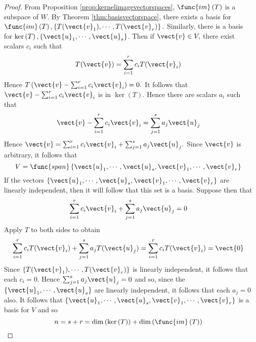 \begin{proof}
From Proposition \ref{prop:kernelimagevectorspaces}, $\func{im}\left( T\right) $
is a subspace of $W.$ By Theorem \ref{thm:basisvectorspace}, there exists a basis for $
\func{im}\left( T\right) ,\left\{ T(\vect{v}_{1}),\cdots ,T(\vect{v}_{r})\right\}
. $ Similarly, there is a basis for $\ker \left( T\right) ,\left\{ \vect{u}
_{1},\cdots ,\vect{u}_{s}\right\} $. Then if $\vect{v}\in V,$ there exist
scalars $c_{i}$ such that 
\begin{equation*}
T(\vect{v})=\sum_{i=1}^{r}c_{i}T(\vect{v}_{i})
\end{equation*}
Hence $T\left( \vect{v}-\sum_{i=1}^{r}c_{i}\vect{v}_{i}\right) =0.$ It follows
that $\vect{v}-\sum_{i=1}^{r}c_{i}\vect{v}_{i}$ is in $\ker \left( T\right) $.
Hence there are scalars $a_{i}$ such that 
\begin{equation*}
\vect{v}-\sum_{i=1}^{r}c_{i}\vect{v}_{i}=\sum_{j=1}^{s}a_{j}\vect{u}_{j}
\end{equation*}
Hence $\vect{v}=\sum_{i=1}^{r}c_{i}\vect{v}_{i}+\sum_{j=1}^{s}a_{j}\vect{u}
_{j}. $ Since $\vect{v}$ is arbitrary, it follows that 
\begin{equation*}
V=\func{span}\left\{ \vect{u}_{1},\cdots ,\vect{u}_{s},\vect{v}_{1},\cdots ,
\vect{v}_{r}\right\}
\end{equation*}
If the vectors $\left\{ \vect{u}_{1},\cdots ,\vect{u}_{s},\vect{v}_{1},\cdots ,
\vect{v}_{r}\right\} $ are linearly independent, then it will follow that
this set is a basis. Suppose then that 
\begin{equation*}
\sum_{i=1}^{r}c_{i}\vect{v}_{i}+\sum_{j=1}^{s}a_{j}\vect{u}_{j}=0
\end{equation*}
Apply $T$ to both sides to obtain 
\begin{equation*}
\sum_{i=1}^{r}c_{i}T(\vect{v}_{i})+\sum_{j=1}^{s}a_{j}T(\vect{u}
_{j})=\sum_{i=1}^{r}c_{i}T(\vect{v}_{i})= \vect{0}
\end{equation*}
Since $\left\{ T(\vect{v}_{1}),\cdots ,T(\vect{v}_{r})\right\} $ is linearly
independent, it follows that each $c_{i}=0.$ Hence $\sum_{j=1}^{s}a_{j}\vect{u
}_{j}=0$ and so, since the $\left\{ \vect{u}_{1},\cdots ,\vect{u}_{s}\right\} $
are linearly independent, it follows that each $a_{j}=0$ also. It follows
that $\left\{ \vect{u}_{1},\cdots ,\vect{u}_{s},\vect{v}_{1},\cdots ,\vect{v}
_{r}\right\} $ is a basis for $V$ and so 
\begin{equation*}
n=s+r=\dim \left( \ker \left( T\right) \right) +\dim \left( \func{im}\left(
T\right) \right)
\end{equation*}
\end{proof}

